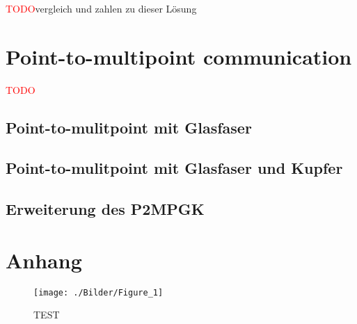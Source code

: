 \documentclass[11pt,a4paper]{article}
\newcommand{\TODO}{\textcolor{red}{TODO}}
\theoremstyle{my_th_style1}
\begin{document}
\TODO vergleich und zahlen zu dieser Lösung

\section{Point-to-multipoint communication}
\TODO
 
 \subsection{Point-to-mulitpoint mit Glasfaser}
 \subsection{Point-to-mulitpoint mit Glasfaser und Kupfer}
 \subsection{Erweiterung des P2MPGK}
 
\newpage

\renewcommand{\refname}{Literaturverzeichnis}

\thispagestyle{empty}
\newpage
\appendix
\section*{Anhang}

\begin{figure}
	\begin{center}
		\begin{minipage}{30.0cm}
			\texttt{[image: ./Bilder/Figure\_1]}
			\caption{TEST}
		\end{minipage}
	\end{center}
\end{figure}


\thispagestyle{empty}
\end{document}
